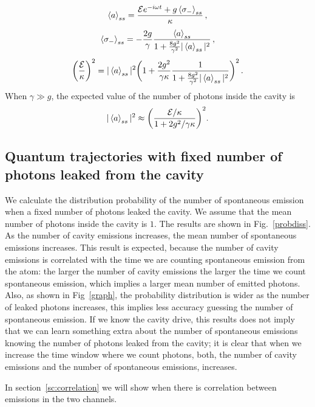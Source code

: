 \documentclass[epj,final]{svjour}
\begin{document}
\begin{equation} \label{chaf1}
\expval{a}_{ss} = \frac{\mathcal{E}e^{-i\omega t} +
  g\expval{\sigma_-}_{ss}}{\kappa}\, ,
\end{equation}
\begin{equation} \label{chaf2}
\expval{\sigma_-}_{ss} = -\frac{2g}{\gamma}\frac{\expval{a}_{ss}}{1 +
  \frac{8g^2}{\gamma^2}|\expval{a}_{ss}|^2}\, ,
\end{equation}
\begin{equation}
\bigg(\frac{\mathcal{E}}{\kappa}\bigg)^2 = |\expval{a}_{ss}|^2 \bigg(1
+ \frac{2g^2}{\gamma \kappa}\frac{1}{1 +
  \frac{8g^2}{\gamma^2}|\expval{a}_{ss}|^2}\bigg)^2\, .
\end{equation}
When $\gamma \gg g$, the expected value of the number of photons inside
the cavity is 
\begin{equation} \label{numfo}
|\expval{a}_{ss}|^2 \approx \bigg(\frac{\mathcal{E}/\kappa}{1 + 2g^2/\gamma \kappa}\bigg)^2.
\end{equation}


\subsection{Quantum trajectories with fixed number of photons leaked from the cavity}
We calculate the distribution probability of the number of spontaneous
emission when a fixed number of photons leaked the cavity. We assume
that the mean number of photons inside the cavity is $1$. The
results are shown in Fig.~\ref{probdiss}. As the number of cavity
emissions increases, the mean number of spontaneous emissions
increases. This result is expected, because the number of cavity
emissions is correlated with the time we are counting spontaneous
emission from the atom: the larger the number of cavity
emissions the larger the time we count spontaneous emission,
which implies a larger mean number of emitted photons. Also, as shown
in Fig~\ref{graph}, the probability distribution is wider as the
number of leaked photons increases, this implies less accuracy
guessing the number of spontaneous emission. If we know the cavity
drive, this results does not imply that we can learn something extra
about the number of spontaneous emissions knowing the number of
photons leaked from the cavity; it is clear that when we increase the
time window where we count photons, both, the number of cavity emissions
and the number of spontaneous emissions, increases.

In section~\ref{sc:correlation} we will show
when there is correlation between emissions in the two channels.
\end{document}
